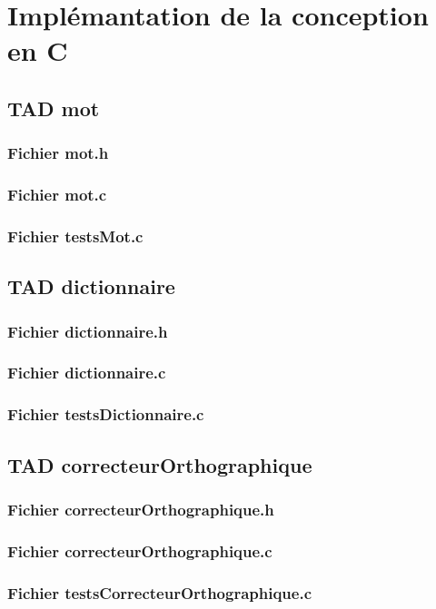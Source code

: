 \section{Implémantation de la conception en C}
	\subsection{TAD mot}
		\subsubsection{Fichier mot.h}
			
		\subsubsection{Fichier mot.c}
			
		\subsubsection{Fichier testsMot.c}
			

	\subsection{TAD dictionnaire}
		\subsubsection{Fichier dictionnaire.h}
			
		\subsubsection{Fichier dictionnaire.c}
			
		\subsubsection{Fichier testsDictionnaire.c}
			

	\subsection{TAD correcteurOrthographique}
		\subsubsection{Fichier correcteurOrthographique.h}
			
		\subsubsection{Fichier correcteurOrthographique.c}
			
		\subsubsection{Fichier testsCorrecteurOrthographique.c}
			

